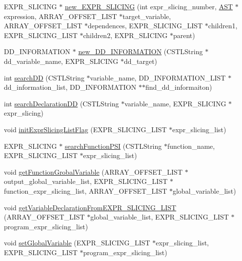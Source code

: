 \begin{DoxyCompactItemize}
\item 
EXPR\_\-SLICING $\ast$ \hyperlink{ProgramSlicingInformation_8h_a5fcaa39f34bebb96e55bfccba380c8f5}{new\_\-EXPR\_\-SLICING} (int expr\_\-slicing\_\-number, \hyperlink{structabstract__syntax__tree}{AST} $\ast$expression, ARRAY\_\-OFFSET\_\-LIST $\ast$target\_\-variable, ARRAY\_\-OFFSET\_\-LIST $\ast$dependences, EXPR\_\-SLICING\_\-LIST $\ast$children1, EXPR\_\-SLICING\_\-LIST $\ast$children2, EXPR\_\-SLICING $\ast$parent)
\item 
DD\_\-INFORMATION $\ast$ \hyperlink{ProgramSlicingInformation_8h_a75837a5e5482fd76c8f4a2671a10d3d4}{new\_\-DD\_\-INFORMATION} (CSTLString $\ast$dd\_\-variable\_\-name, EXPR\_\-SLICING $\ast$dd\_\-target)
\item 
int \hyperlink{ProgramSlicingInformation_8h_af533fcded426eaf0b3b9b169fafb9e34}{searchDD} (CSTLString $\ast$variable\_\-name, DD\_\-INFORMATION\_\-LIST $\ast$dd\_\-information\_\-list, DD\_\-INFORMATION $\ast$$\ast$find\_\-dd\_\-informaiton)
\item 
int \hyperlink{ProgramSlicingInformation_8h_a42b98f7dd2e05ea0af7ed5dd81415cb6}{searchDeclarationDD} (CSTLString $\ast$variable\_\-name, EXPR\_\-SLICING $\ast$expr\_\-slicing)
\item 
void \hyperlink{ProgramSlicingInformation_8h_ae9d6d94c4a2b9bf4cc6e35620cc52ea8}{initExprSlicingListFlag} (EXPR\_\-SLICING\_\-LIST $\ast$expr\_\-slicing\_\-list)
\item 
EXPR\_\-SLICING $\ast$ \hyperlink{ProgramSlicingInformation_8h_a73184dab14bd4aeaf82989656be695dc}{searchFunctionPSI} (CSTLString $\ast$function\_\-name, EXPR\_\-SLICING\_\-LIST $\ast$expr\_\-slicing\_\-list)
\item 
void \hyperlink{ProgramSlicingInformation_8h_a178cb629f672a2f68302e62c732a063d}{getFunctionGrobalVariable} (ARRAY\_\-OFFSET\_\-LIST $\ast$output\_\-global\_\-variable\_\-list, EXPR\_\-SLICING\_\-LIST $\ast$function\_\-expr\_\-slicing\_\-list, ARRAY\_\-OFFSET\_\-LIST $\ast$global\_\-variable\_\-list)
\item 
void \hyperlink{ProgramSlicingInformation_8h_a20f45d90df7114a8ba80c98a350ee639}{getVariableDeclarationFromEXPR\_\-SLICING\_\-LIST} (ARRAY\_\-OFFSET\_\-LIST $\ast$global\_\-variable\_\-list, EXPR\_\-SLICING\_\-LIST $\ast$program\_\-expr\_\-slicing\_\-list)
\item 
void \hyperlink{ProgramSlicingInformation_8h_aee829d9ec3393e8267b2f5af0d356bae}{setGlobalVariable} (EXPR\_\-SLICING\_\-LIST $\ast$expr\_\-slicing\_\-list, EXPR\_\-SLICING\_\-LIST $\ast$program\_\-expr\_\-slicing\_\-list)
$$
\end{DoxyCompactItemize}
